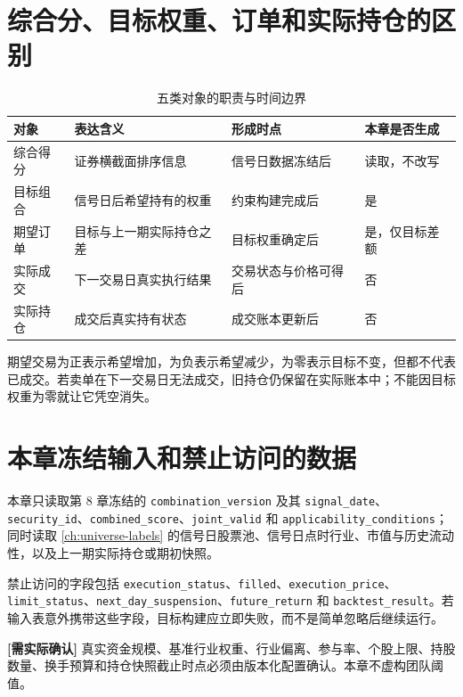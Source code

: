 \section{综合分、目标权重、订单和实际持仓的区别}

\begin{table}[htbp]
  \centering
  \small
  \caption{五类对象的职责与时间边界}
  \label{tab:ch09-object-responsibilities}
  \begin{tabularx}{\textwidth}{p{2.7cm} p{4.5cm} p{3.2cm} Y}
    \toprule
    对象 & 表达含义 & 形成时点 & 本章是否生成 \\
    \midrule
    综合得分 & 证券横截面排序信息 & 信号日数据冻结后 & 读取，不改写 \\
    目标组合 & 信号日后希望持有的权重 & 约束构建完成后 & 是 \\
    期望订单 & 目标与上一期实际持仓之差 & 目标权重确定后 & 是，仅目标差额 \\
    实际成交 & 下一交易日真实执行结果 & 交易状态与价格可得后 & 否 \\
    实际持仓 & 成交后真实持有状态 & 成交账本更新后 & 否 \\
    \bottomrule
  \end{tabularx}
\end{table}

期望交易为正表示希望增加，为负表示希望减少，为零表示目标不变，但都不代表已成交。若卖单在下一交易日无法成交，旧持仓仍保留在实际账本中；不能因目标权重为零就让它凭空消失。

\section{本章冻结输入和禁止访问的数据}

本章只读取第 8 章冻结的 \texttt{combination\_version} 及其 \texttt{signal\_date}、\texttt{security\_id}、\texttt{combined\_score}、\texttt{joint\_valid} 和 \texttt{applicability\_conditions}；同时读取 \cref{ch:universe-labels} 的信号日股票池、信号日点时行业、市值与历史流动性，以及上一期实际持仓或期初快照。

禁止访问的字段包括 \texttt{execution\_status}、\texttt{filled}、\texttt{execution\_price}、\texttt{limit\_status}、\texttt{next\_day\_suspension}、\texttt{future\_return} 和 \texttt{backtest\_result}。若输入表意外携带这些字段，目标构建应立即失败，而不是简单忽略后继续运行。

\begin{confirmbox}
\textbf{[需实际确认]} 真实资金规模、基准行业权重、行业偏离、参与率、个股上限、持股数量、换手预算和持仓快照截止时点必须由版本化配置确认。本章不虚构团队阈值。
\end{confirmbox}

